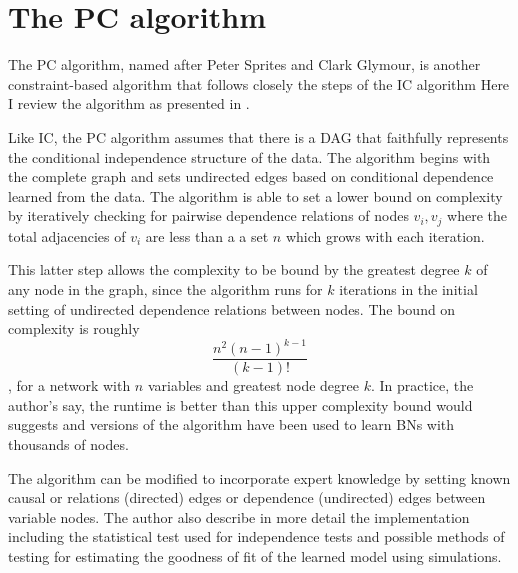   \section{The PC algorithm}

    The PC algorithm, named after Peter Sprites and 
    Clark Glymour, is another constraint-based algorithm
    that follows closely the steps of the IC algorithm
    Here I review the algorithm as presented in 
     \cite{SpirtesPeter;GlymourClark;Scheines2001}.

    
    Like IC, the PC algorithm assumes that there is a 
    DAG that faithfully represents the conditional 
    independence structure of the data. The algorithm 
    begins with the complete graph and sets undirected
    edges based on conditional dependence learned from the 
    data. The algorithm 
    is able to set a lower bound on complexity by iteratively
    checking for pairwise dependence relations of 
    nodes $v_i, v_j$ where the total adjacencies of $v_i$
    are less than a a set $n$ which grows with each iteration. 

    This latter step allows the complexity to be bound by 
    the greatest degree $k$ of any node in the graph, 
    since the algorithm runs for $k$ iterations in 
    the initial setting of undirected dependence
    relations between nodes. The bound on complexity is roughly
    \[
    \frac{ n^2(n-1)^{k-1} }{(k-1)! } 
    \]
    , for a network with
    $n$ variables and greatest node degree $k$. In practice, 
    the author's say, the runtime is better than this
    upper complexity bound would suggests and versions of the algorithm
    have been used to learn BNs with thousands of nodes.

    The algorithm can be modified to incorporate expert 
    knowledge by setting known causal or 
   relations (directed)
    edges or dependence (undirected) edges between variable
    nodes. The author also describe in more detail the 
    implementation including the statistical test
    used for independence tests and possible methods of
    testing for estimating the goodness of fit of the
    learned model using simulations. 

